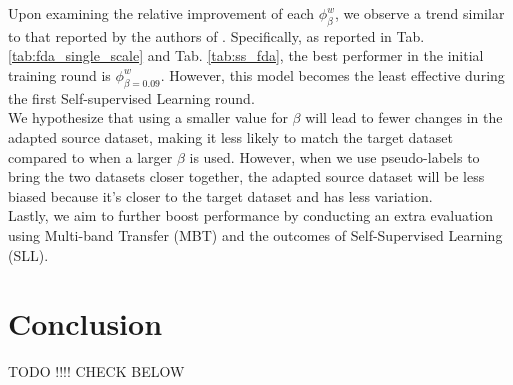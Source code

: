 \documentclass[10pt,twocolumn,letterpaper]{article}
\begin{document}
Upon examining the relative improvement of each $\phi^w_{\beta}$, we observe a trend similar to that reported by the authors of \cite{fda}. Specifically, as reported in Tab. \ref{tab:fda_single_scale} and Tab. \ref{tab:ss_fda}, the best performer in the initial training round is $\phi^w_{{\beta} = 0.09}$. However, this model becomes the least effective during the first Self-supervised Learning round.\\
We hypothesize that using a smaller value for $\beta$ will lead to fewer changes in the adapted source dataset, making it less likely to match the target dataset compared to when a larger $\beta$ is used. However, when we use pseudo-labels to bring the two datasets closer together, the adapted source dataset will be less biased because it’s closer to the target dataset and has less variation.\\
Lastly, we aim to further boost performance by conducting an extra evaluation using Multi-band Transfer (MBT) and the outcomes of Self-Supervised Learning (SLL).










\section{Conclusion}

TODO !!!! CHECK BELOW
\end{document}
